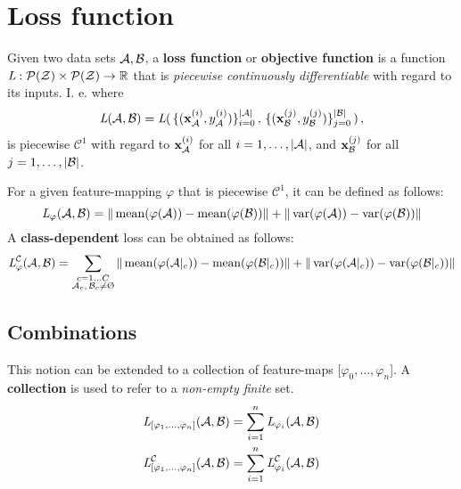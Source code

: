 \section{Loss function}
Given two data sets $\mathcal A, \mathcal B$, a \textbf{loss function} or \textbf{objective function} is a function $\textit{L} : \mathcal P(\mathcal Z) \times \mathcal P(\mathcal Z) \to \mathbb{R}$ that is \textit{piecewise continuously differentiable} with regard to its inputs.
I. e. where 
\[
    \textit{L} (\mathcal A, \mathcal B) = \textit{L} (
    \,\{(\mathbf x^{(i)}_{\mathcal A}, y^{(i)}_{\mathcal A})\}_{i=0}^{|\mathcal A|}\,,
    \,\{(\mathbf x^{(j)}_{\mathcal B}, y^{(j)}_{\mathcal B})\}_{j=0}^{|\mathcal B|}\,) \,,
\]
is piecewise $\mathcal C^1$ with regard to $\mathbf x^{(i)}_{\mathcal A}$
for all $i=1, \dots, |\mathcal A|$, and $\mathbf x^{(j)}_{\mathcal B}$ for all $j=1, \dots, |\mathcal B|$.

For a given feature-mapping $\varphi$ that is piecewise $\mathcal C ^1$, it can be defined as follows:
% 
\[
    \textit{L} _{\varphi} (\mathcal A, \mathcal B) = 
    \|\operatorname{mean} ({\varphi (\mathcal A)}) - \operatorname{mean} ({\varphi (\mathcal B)})\| +
    \|\operatorname{var} ({\varphi (\mathcal A)}) - \operatorname{var} ({\varphi (\mathcal B)})\|
\]
% 
A \textbf{class-dependent} loss can be obtained as follows:
\[
    \loss _\varphi ^{\mathcal C} (\set A, \set B) =
    \sum _{\substack{c = 1 \dots C \\ \set A_c ,\, \set B_c \neq \emptyset}} 
    \|\mean ({\varphi (\set A|_c)}) - \mean({\varphi (\set B|_c)})\|
    + \|\var ({\varphi (\set A|_c)}) - \var ({\varphi (\set B|_c)})\| 
\]

\subsection{Combinations}
% 
This notion can be extended to a collection of feature-maps [$\varphi_0, \dots, \varphi_n$].
A \textbf{collection} is used to refer to a \textit{non-empty finite} set.
\begin{align*}
    \textit{L}_{[\varphi_1, \dots, \varphi_n]} (\mathcal A, \mathcal B) &= 
    \sum_{i=1}^n \textit{L}_{\varphi_i} (\mathcal A, \mathcal B) \\
    \textit{L}_{[\varphi_1, \dots, \varphi_n]}^{\mathcal C} (\mathcal A, \mathcal B) &= 
    \sum_{i=1}^n \textit{L}_{\varphi_i}^{\mathcal C} (\mathcal A, \mathcal B)
\end{align*}
